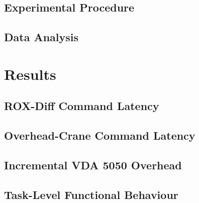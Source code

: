 \subsection{Experimental Procedure}
\label{subsec:procedure}

\subsection{Data Analysis}
\label{subsec:analysis}

\section{Results}
\label{sec:results}

\subsection{ROX-Diff Command Latency}
\label{subsec:rox_results}

\subsection{Overhead-Crane Command Latency}
\label{subsec:crane_results}

\subsection{Incremental VDA 5050 Overhead}
\label{subsec:overhead_results}

\subsection{Task-Level Functional Behaviour}
\label{subsec:functional_results}
